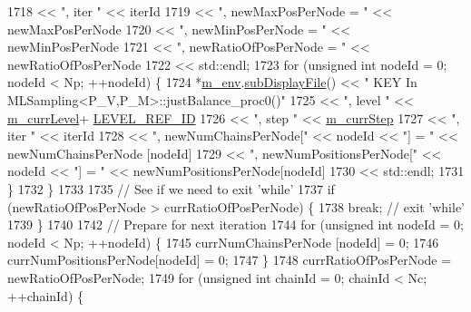 \begin{DoxyCode}
1718                               << \textcolor{stringliteral}{", iter "}  << iterId
1719                               << \textcolor{stringliteral}{", newMaxPosPerNode = "}     << newMaxPosPerNode
1720                               << \textcolor{stringliteral}{", newMinPosPerNode = "}     << newMinPosPerNode
1721                               << \textcolor{stringliteral}{", newRatioOfPosPerNode = "} << newRatioOfPosPerNode
1722                               << std::endl;
1723       \textcolor{keywordflow}{for} (\textcolor{keywordtype}{unsigned} \textcolor{keywordtype}{int} nodeId = 0; nodeId < Np; ++nodeId) \{
1724         *\hyperlink{class_q_u_e_s_o_1_1_m_l_sampling_a13f1ca4fe9f94822fe572a743eaced1d}{m\_env}.\hyperlink{class_q_u_e_s_o_1_1_base_environment_a8a0064746ae8dddfece4229b9ad374d6}{subDisplayFile}() << \textcolor{stringliteral}{"  KEY In MLSampling<P\_V,P\_M>::justBalance\_proc0()"}
1725                                 << \textcolor{stringliteral}{", level "} << \hyperlink{class_q_u_e_s_o_1_1_m_l_sampling_af9416874c856e50f3b35270e801f17e4}{m\_currLevel}+
      \hyperlink{_m_l_sampling_level_options_8h_a68d15eaf394d210effcf584b938206d3}{LEVEL\_REF\_ID}
1726                                 << \textcolor{stringliteral}{", step "}  << \hyperlink{class_q_u_e_s_o_1_1_m_l_sampling_a1b1f8ccb4823bdfa26ec652f0807c63e}{m\_currStep}
1727                                 << \textcolor{stringliteral}{", iter "}  << iterId
1728                                 << \textcolor{stringliteral}{", newNumChainsPerNode["}    << nodeId << \textcolor{stringliteral}{"] = "} << newNumChainsPerNode  
       [nodeId]
1729                                 << \textcolor{stringliteral}{", newNumPositionsPerNode["} << nodeId << \textcolor{stringliteral}{"] = "} << 
      newNumPositionsPerNode[nodeId]
1730                                 << std::endl;
1731       \}
1732     \}
1733 
1735     \textcolor{comment}{// See if we need to exit 'while'}
1737 \textcolor{comment}{}    \textcolor{keywordflow}{if} (newRatioOfPosPerNode > currRatioOfPosPerNode) \{
1738       \textcolor{keywordflow}{break}; \textcolor{comment}{// exit 'while'}
1739     \}
1740 
1742     \textcolor{comment}{// Prepare for next iteration}
1744 \textcolor{comment}{}    \textcolor{keywordflow}{for} (\textcolor{keywordtype}{unsigned} \textcolor{keywordtype}{int} nodeId = 0; nodeId < Np; ++nodeId) \{
1745       currNumChainsPerNode   [nodeId] = 0;
1746       currNumPositionsPerNode[nodeId] = 0;
1747     \}
1748     currRatioOfPosPerNode = newRatioOfPosPerNode;
1749     \textcolor{keywordflow}{for} (\textcolor{keywordtype}{unsigned} \textcolor{keywordtype}{int} chainId = 0; chainId < Nc; ++chainId) \{

\end{DoxyCode}
